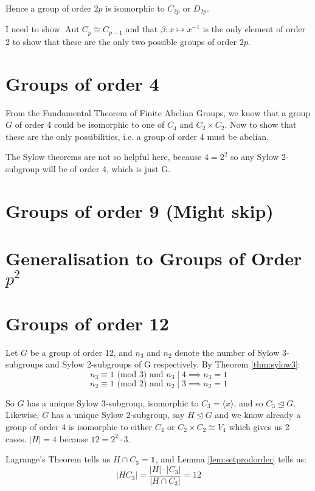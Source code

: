 \documentclass[a4paper, oneside, 12pt, draft]{article}
\theoremstyle{definition}
\DeclareMathOperator{\Aut}{Aut}
\begin{document}
Hence a group of order \(2p\) is isomorphic to \(C_{2p}\) or \(D_{2p}\).

I need to show \(\Aut{C_p} \cong C_{p-1}\) and that \(\beta:x \mapsto x^{-1}\)
is the only element of order 2 to show that these are the only two possible
groups of order \(2p\).

\section{Groups of order 4}
From the Fundamental Theorem of Finite Abelian Groups, we know that a group
\(G\) of order 4 could be isomorphic to one of \(C_4\) and \(C_2 \times C_2\).
Now to show that these are the only possibilities, i.e. a group of order 4 must
be abelian.

The Sylow theorems are not so helpful here, because \(4=2^2\) so any Sylow
2-subgroup will be of order 4, which is just G.

\section{Groups of order 9 (Might skip)}

\section{Generalisation to Groups of Order \(p^2\)}

\section{Groups of order 12}
Let \(G\) be a group of order 12, and \(n_3\) and \(n_2\) denote the number of
Sylow 3-subgroups and Sylow 2-subgroups of G respectively.
By Theorem \ref{thm:sylow3}:
\[n_3 \equiv 1 \text{ (mod 3) and } n_3 \mid 4 \implies n_3 = 1\]
\[n_2 \equiv 1 \text{ (mod 2) and } n_2 \mid 3 \implies n_2 = 1\]

So \(G\) has a unique Sylow 3-subgroup, isomorphic to \(C_3 = \langle x
\rangle\), and so \(C_3 \unlhd G\). Likewise, \(G\) has a unique Sylow
2-subgroup, say \(H \unlhd G\) and we know already a group of order 4 is
isomorphic to either \(C_4\) or \(C_2 \times C_2 \cong V_4\) which gives us 2 cases.
\(|H| = 4\) because \(12 = 2^2 \cdot 3\).

Lagrange's Theorem tells us \(H \cap C_3 = \bm{1}\), and Lemma
\ref{lem:setprodorder} tells us:
\[|H C_3| = \frac{|H| \cdot |C_3|}{|H \cap C_3|} = 12\]
\end{document}
